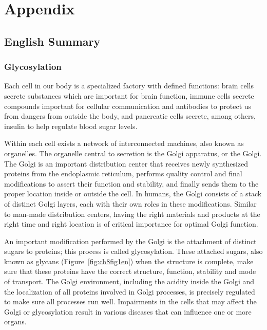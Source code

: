 
\stopthumb




\chapter{Appendix}


\clearpage

\continuethumb

\section{English Summary}

\subsection{Glycosylation}

Each cell in our body is a specialized factory with defined functions: brain cells secrete substances which are important for brain function, immune cells secrete compounds important for cellular communication and antibodies to protect us from dangers from outside the body, and pancreatic cells secrete, among others, insulin to help regulate blood sugar levels.

Within each cell exists a network of interconnected machines, also known as organelles. The organelle central to secretion is the Golgi apparatus, or the Golgi. The Golgi is an important distribution center that receives newly synthesized proteins from the endoplasmic reticulum, performs quality control and final modifications to assert their function and stability, and finally sends them to the proper location inside or outside the cell. In humans, the Golgi consists of a stack of distinct Golgi layers, each with their own roles in these modifications. Similar to man-made distribution centers, having the right materials and products at the right time and right location is of critical importance for optimal Golgi function.

An important modification performed by the Golgi is the attachment of distinct sugars to proteins; this process is called glycosylation\cite{moremen_vertebrate_2012}. These attached sugars, also known as glycans (Figure~\ref{fig:ch8fig1en}) when the structure is complete, make sure that these proteins have the correct structure, function, stability and mode of transport. The Golgi environment, including the acidity inside the Golgi and the localization of all proteins involved in Golgi processes, is precisely regulated to make sure all processes run well. Impairments in the cells that may affect the Golgi or glycosylation result in various diseases that can influence one or more organs.

